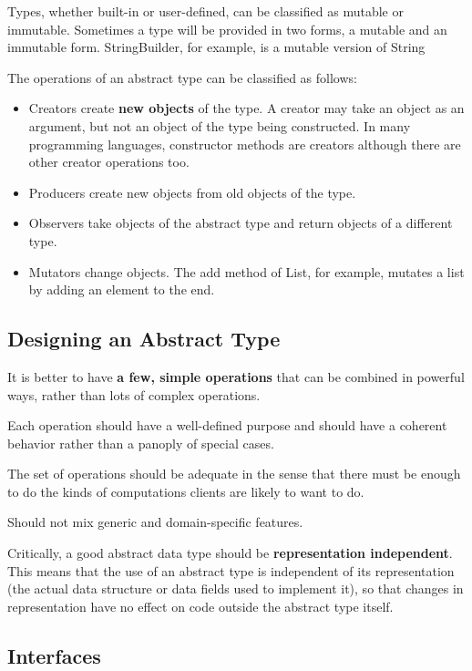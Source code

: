 \documentclass[letterpaper,12pt]{article}
\begin{document}
Types, whether built-in or user-defined, can be classified as mutable or
immutable. Sometimes a type will be provided in two forms, a mutable and an
immutable form. StringBuilder, for example, is a mutable version of String

The operations of an abstract type can be classified as follows:

\begin{itemize}
      \item Creators create \textbf{new objects} of the type. A creator may take an object
            as an argument, but not an object of the type being constructed. In many
            programming languages, constructor methods are creators although there are
            other creator operations too.
      \item Producers create new objects from old objects of the type.
      \item Observers take objects of the abstract type and return objects of a different
            type.
      \item Mutators change objects. The add\(\) method of List, for example, mutates a
            list by adding an element to the end.
\end{itemize}

\subsection{Designing an Abstract Type}

It is better to have \textbf{a few, simple operations} that can be combined in
powerful ways, rather than lots of complex operations.

Each operation should have a well-defined purpose and should have a coherent
behavior rather than a panoply of special cases.

The set of operations should be adequate in the sense that there must be enough
to do the kinds of computations clients are likely to want to do.

Should not mix generic and domain-specific features.

Critically, a good abstract data type should be \textbf{representation
      independent}. This means that the use of an abstract type is independent of its
representation (the actual data structure or data fields used to implement it),
so that changes in representation have no effect on code outside the abstract
type itself.

\subsection{Interfaces}
\end{document}
